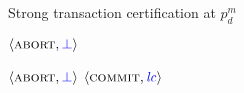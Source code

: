 
\begin{algorithm*}[t]
  \caption{Strong transaction certification at $p^{m}_{d}$}
  \label{alg:unistore-certification}
  \begin{algorithmic}[1]
      \label{function:certification}
        \label{line:certification-preparedstrong}
          \label{line:certification-conflict}
          \State \Return $\langle \textsc{abort}, \textcolor{blue}{\bot} \rangle$
            \label{line:certification-preparedstrong-abort}
        \EndIf
      \EndFor

      \hStatex
        \label{line:certification-decidedstrong}
          \State \Return $\langle \textsc{abort}, \textcolor{blue}{\bot} \rangle$
            \label{line:certification-decidedstrong-abort}
        \EndIf
          \State {}
          \label{line:certification-lc}
        \EndIf
      \EndFor
      \State \Return $\langle \textsc{commit}, \textcolor{blue}{\mathit{lc}} \rangle$
        \label{line:certification-return}
    \EndFunction
  \end{algorithmic}
\end{algorithm*}